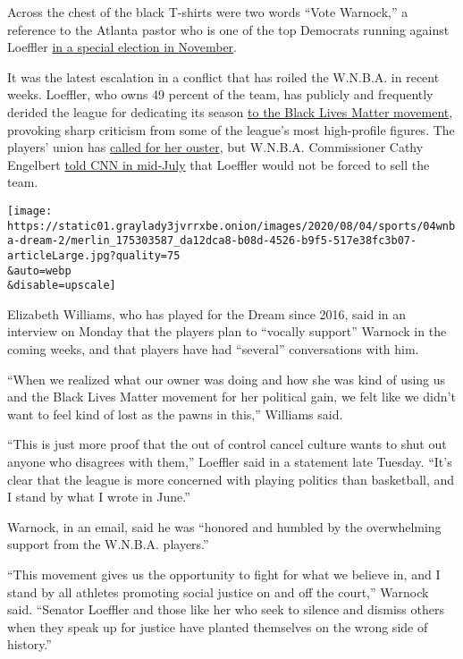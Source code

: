 Across the chest of the black T-shirts were two words ``Vote Warnock,''
a reference to the Atlanta pastor who is one of the top Democrats
running against Loeffler
\href{https://www.nytimes3xbfgragh.onion/2020/07/09/us/politics/kelly-loeffler-georgia-senate-arizona.html}{in
a special election in November}.

It was the latest escalation in a conflict that has roiled the W.N.B.A.
in recent weeks. Loeffler, who owns 49 percent of the team, has publicly
and frequently derided the league for dedicating its season
\href{https://www.nytimes3xbfgragh.onion/2020/07/09/sports/basketball/kelly-loeffler-atlanta-dream-protests.html}{to
the Black Lives Matter movement}, provoking sharp criticism from some of
the league's most high-profile figures. The players' union has
\href{https://twitter.com/TheWNBPA?ref_src=twsrc\%5Egoogle\%7Ctwcamp\%5Eserp\%7Ctwgr\%5Eauthor}{called
for her ouster}, but W.N.B.A. Commissioner Cathy Engelbert
\href{https://www.youtube.com/watch?v=rVaI_-G8Nd0}{told CNN in mid-July}
that Loeffler would not be forced to sell the team.

\texttt{[image: https://static01.graylady3jvrrxbe.onion/images/2020/08/04/sports/04wnba-dream-2/merlin\_175303587\_da12dca8-b08d-4526-b9f5-517e38fc3b07-articleLarge.jpg?quality=75\\\&auto=webp\\\&disable=upscale]}

Elizabeth Williams, who has played for the Dream since 2016, said in an
interview on Monday that the players plan to ``vocally support'' Warnock
in the coming weeks, and that players have had ``several'' conversations
with him.

``When we realized what our owner was doing and how she was kind of
using us and the Black Lives Matter movement for her political gain, we
felt like we didn't want to feel kind of lost as the pawns in this,''
Williams said.

``This is just more proof that the out of control cancel culture wants
to shut out anyone who disagrees with them,'' Loeffler said in a
statement late Tuesday. ``It's clear that the league is more concerned
with playing politics than basketball, and I stand by what I wrote in
June.''

Warnock, in an email, said he was ``honored and humbled by the
overwhelming support from the W.N.B.A. players.''

``This movement gives us the opportunity to fight for what we believe
in, and I stand by all athletes promoting social justice on and off the
court,'' Warnock said. ``Senator Loeffler and those like her who seek to
silence and dismiss others when they speak up for justice have planted
themselves on the wrong side of history.''

